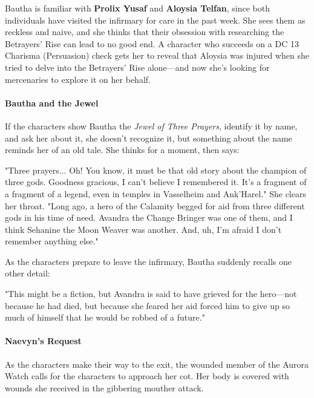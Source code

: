 \documentclass[a4paper, 11pt, bg=full, twocolumn, nooutline]{dndbook}
\begin{document}
Bautha is familiar with \textbf{Prolix Yusaf} and \textbf{Aloysia Telfan}, since both individuals have visited the infirmary for care in the past week. She sees them as reckless and naive, and she thinks that their obsession with researching the Betrayers' Rise can lead to no good end. A character who succeeds on a DC 13 Charisma (Persuasion) check gets her to reveal that Aloysia was injured when she tried to delve into the Betrayers' Rise alone---and now she's looking for mercenaries to explore it on her behalf.

\paragraph{Bautha and the Jewel}

If the characters show Bautha the \textit{Jewel of Three Prayers}, identify it by name, and ask her about it, she doesn't recognize it, but something about the name reminds her of an old tale. She thinks for a moment, then says:

\begin{DndReadAloud}
"Three prayers... Oh! You know, it must be that old story about the champion of three gods. Goodness gracious, I can't believe I remembered it. It's a fragment of a fragment of a legend, even in temples in Vasselheim and Ank'Harel." She clears her throat. "Long ago, a hero of the Calamity begged for aid from three different gods in his time of need. Avandra the Change Bringer was one of them, and I think Sehanine the Moon Weaver was another. And, uh, I'm afraid I don't remember anything else."
\end{DndReadAloud}

As the characters prepare to leave the infirmary, Bautha suddenly recalls one other detail:

\begin{DndReadAloud}
"This might be a fiction, but Avandra is said to have grieved for the hero---not because he had died, but because she feared her aid forced him to give up so much of himself that he would be robbed of a future."
\end{DndReadAloud}

\paragraph{Naevyn's Request}

As the characters make their way to the exit, the wounded member of the Aurora Watch calls for the characters to approach her cot. Her body is covered with wounds she received in the gibbering mouther attack.
\end{document}

